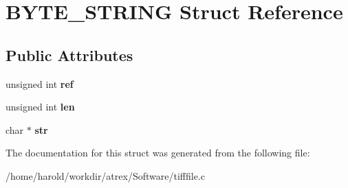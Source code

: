 \hypertarget{structBYTE__STRING}{\section{B\-Y\-T\-E\-\_\-\-S\-T\-R\-I\-N\-G Struct Reference}
\label{structBYTE__STRING}
}
\subsection*{Public Attributes}
\begin{DoxyCompactItemize}
\item 
\hypertarget{structBYTE__STRING_a8da8577d70c09a0f8dc481b4d28a7586}{unsigned int {\bfseries ref}}\label{structBYTE__STRING_a8da8577d70c09a0f8dc481b4d28a7586}

\item 
\hypertarget{structBYTE__STRING_a99dbb11de28b137e585323a82ae6d886}{unsigned int {\bfseries len}}\label{structBYTE__STRING_a99dbb11de28b137e585323a82ae6d886}

\item 
\hypertarget{structBYTE__STRING_aa3466d17d921ace130316522aa93b161}{char $\ast$ {\bfseries str}}\label{structBYTE__STRING_aa3466d17d921ace130316522aa93b161}

\end{DoxyCompactItemize}


The documentation for this struct was generated from the following file\-:\begin{DoxyCompactItemize}
\item 
/home/harold/workdir/atrex/\-Software/tifffile.\-c\end{DoxyCompactItemize}
